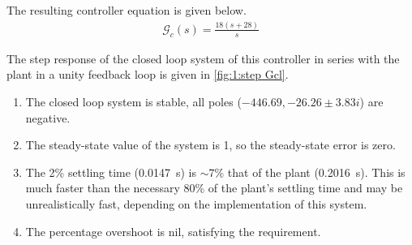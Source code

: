 The resulting controller equation is given below.
\begin{align*}
	\mathcal{G}_c(s) = \frac{18(s+28)}{s}
\end{align*}

 The step response of the closed loop system of this controller in series with the plant in a unity feedback loop is given in \cref{fig:1:step Gcl}.
 \begin{enumerate}
 	\item The closed loop system is stable, all poles ($-446.69, -26.26\pm \num{3.83i}$) are negative.
 	\item The steady-state value of the system is 1, so the steady-state error is zero.
 	\item The 2\% settling time (\SI{0.0147}{\second}) is $\sim 7\%$ that of the plant (\SI{0.2016}{\second}). This is much faster than the necessary 80\% of the plant's settling time and may be unrealistically fast, depending on the implementation of this system.
 	\item The percentage overshoot is nil, satisfying the requirement.
 \end{enumerate}


